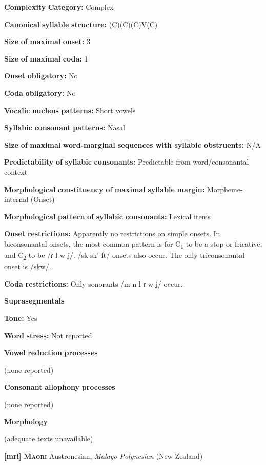 \begin{styleBody}
\textbf{Complexity} \textbf{Category:} Complex

\textbf{Canonical} \textbf{syllable} \textbf{structure:} (C)(C)(C)V(C) \citep[23-24]{Allison2012}

\textbf{Size} \textbf{of} \textbf{maximal} \textbf{onset:} 3

\textbf{Size} \textbf{of} \textbf{maximal} \textbf{coda:} 1

\textbf{Onset} \textbf{obligatory:} No

\textbf{Coda} \textbf{obligatory:} No

\textbf{Vocalic} \textbf{nucleus} \textbf{patterns:} Short vowels

\textbf{Syllabic} \textbf{consonant} \textbf{patterns:} Nasal

\textbf{Size} \textbf{of} \textbf{maximal} \textbf{word{}-marginal sequences with syllabic obstruents:} N/A

\textbf{Predictability} \textbf{of} \textbf{syllabic} \textbf{consonants:} Predictable from word/consonantal context

\textbf{Morphological} \textbf{constituency} \textbf{of} \textbf{maximal} \textbf{syllable} \textbf{margin:} Morpheme-internal (Onset)

\textbf{Morphological} \textbf{pattern} \textbf{of} \textbf{syllabic} \textbf{consonants:} Lexical items

\textbf{Onset} \textbf{restrictions:} Apparently no restrictions on simple onsets. In biconsonantal onsets, the most common pattern is for C\textsubscript{1} to be a stop or fricative, and C\textsubscript{2} to be /ɾ l w j/. /sk sk’ ft/ onsets also occur. The only triconsonantal onset is /skw/.

\textbf{Coda} \textbf{restrictions:} Only sonorants /m n l ɾ w j/ occur.

\textbf{Suprasegmentals}

\textbf{Tone:} Yes

\textbf{Word} \textbf{stress:} Not reported

\textbf{Vowel} \textbf{reduction} \textbf{processes}

(none reported)

\textbf{Consonant} \textbf{allophony} \textbf{processes}

(none reported)

\textbf{Morphology}

(adequate texts unavailable)

\textbf{[mri]}   \textbf{\textsc{Maori}}  Austronesian, \textit{Malayo-Polynesian} (New Zealand)


\end{styleBody}
